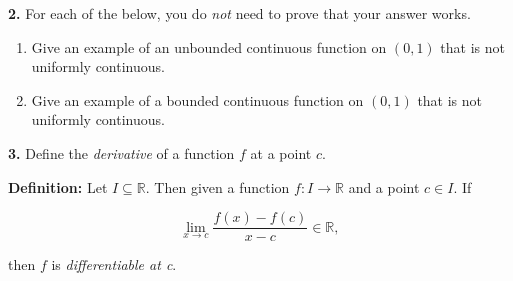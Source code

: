 \documentclass[12pt, a4paper]{article}
\begin{document}
\noindent\textbf{2.} For each of the below, you do \textit{not} need to prove that your answer works.

\begin{enumerate}[label=(\alph*)]
    \item Give an example of an unbounded continuous function on $(0,1)$ that is not uniformly continuous.
    
    
    \item Give an example of a bounded continuous function on $(0,1)$ that is not uniformly continuous.
    
\end{enumerate}

\noindent\textbf{3.} Define the \textit{derivative} of a function $f$ at a point $c$.

\begin{description}
    \item\textbf{Definition:} Let $I\subseteq\mathbb{R}$. Then given a function $f\colon I\rightarrow\mathbb{R}$ and a point $c\in I$. If 
    
    \begin{equation*}
        \lim\limits_{x\rightarrow c}\frac{f(x)-f(c)}{x-c}\in\mathbb{R},
    \end{equation*}
    
    \vspace{2mm}
    
    \item then $f$ is \textit{differentiable at c}.
\end{description}
\end{document}
